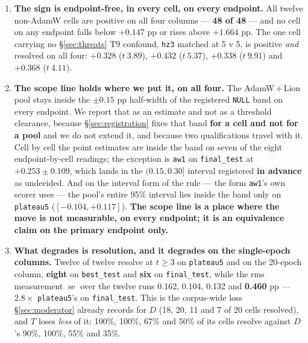 \documentclass[10pt,letterpaper]{article}
\newcommand{\Dstat}{D}                         %
\newcommand{\Tstat}{T}                         %
\newcommand{\plateau}{\texttt{plateau5}}
\newcommand{\arm}[1]{\texttt{#1}}
\DeclareMathOperator{\se}{se}
\begin{document}
\begin{enumerate}
\item \textbf{The sign is endpoint-free, in every cell, on every endpoint.} All twelve
  non-AdamW cells are positive on all four columns --- \textbf{48 of 48} --- and no cell on any
  endpoint falls below $+0.147$ pp or rises above $+1.664$ pp. The one cell carrying no
  \S\ref{sec:threats} T9 confound, \arm{hz3} matched at 5 v 5, is positive \emph{and} resolved
  on all four: $+0.328$ ($t\ 3.89$), $+0.432$ ($t\ 5.37$), $+0.338$ ($t\ 9.91$) and
  $+0.368$ ($t\ 4.11$).
\item \textbf{The scope line holds where we put it, on all four.} The AdamW\,+\,Lion pool stays
  inside the $\pm 0.15$ pp half-width of the registered \texttt{NULL} band on every endpoint.
  We report that as an estimate and not as a threshold clearance, because
  \S\ref{sec:registration} fixes that band \textbf{for a cell and not for a pool} and we do not
  extend it, and because two qualifications travel with it. Cell by cell the point estimates are
  inside the band on seven of the eight endpoint-by-cell readings; the exception is \arm{aw1} on
  \texttt{final\_test} at $+0.253 \pm 0.109$, which lands in the $(0.15, 0.30]$ interval
  registered \textbf{in advance} as undecided. And on the interval form of the rule --- the form
  \arm{aw1}'s own scorer uses --- the pool's entire 95\% interval lies inside the band only on
  \plateau{} ($[-0.104, +0.117]$). \textbf{The scope line is a place where the move is not
  measurable, on every endpoint; it is an equivalence claim on the primary endpoint only.}
\item \textbf{What degrades is resolution, and it degrades on the single-epoch columns.}
  Twelve of twelve resolve at $t \ge 3$ on \plateau{} and on the 20-epoch column, \textbf{eight}
  on \texttt{best\_test} and \textbf{six} on \texttt{final\_test}, while the rms measurement
  $\se$ over the twelve runs 0.162, 0.104, 0.132 and \textbf{0.460} pp --- $2.8\times$
  \plateau{}'s on \texttt{final\_test}. This is the corpus-wide loss \S\ref{sec:moderator}
  already records for $\Dstat$ (18, 20, 11 and 7 of 20 cells resolved), and $\Tstat$ loses
  \emph{less} of it: 100\%, 100\%, 67\% and 50\% of its cells resolve against $\Dstat$'s 90\%,
  100\%, 55\% and 35\%.
\end{enumerate}
\end{document}

